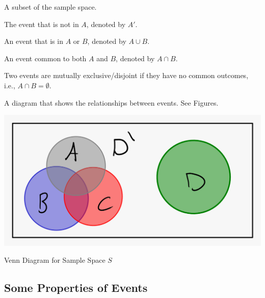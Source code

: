 \documentclass{article}
\begin{document}
\begin{definition}[Event]
A subset of the sample space.
\end{definition}

\begin{definition}[Complement]
The event that is not in $A$, denoted by $A'$.
\end{definition}

\begin{definition}[Union]
An event that is in $A$ or $B$, denoted by $A \cup B$.
\end{definition}

\begin{definition}[Intersection]
An event common to both $A$ and $B$, denoted by $A \cap B$.
\end{definition}

\begin{definition}
Two events are mutually exclusive/disjoint if they have no common outcomes, i.e., $A \cap B = \emptyset$.
\label{def:mutually_exclusive}
\end{definition}

\begin{definition}
A diagram that shows the relationships between events. See Figures.
\end{definition}

\begin{marginfigure}
    \centering
    \includegraphics[width=\textwidth]{figures/ven-diagram.jpeg}
    \caption{Venn Diagram for Sample Space \( S \)}
    \label{fig:sample_space}
\end{marginfigure}

\subsection{Some Properties of Events}
\end{document}
